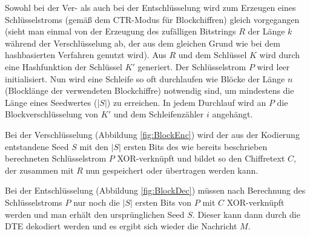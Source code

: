 Sowohl bei der Ver- als auch bei der Entschlüsselung wird zum Erzeugen eines Schlüsselstroms (gemäß dem CTR-Modus für Blockchiffren) gleich vorgegangen (sieht man einmal von der Erzeugung des zufälligen Bitstrings \(R\) der Länge \(k\) während der Verschlüsselung ab, der aus dem gleichen Grund wie bei dem hashbasierten Verfahren genutzt wird). Aus \(R\) und dem Schlüssel \(K\) wird durch eine Hashfunktion der Schlüssel \(K'\) generiert. Der Schlüsselstrom \(P\) wird leer initialisiert. Nun wird eine Schleife so oft durchlaufen wie Blöcke der Länge \(n\) (Blocklänge der verwendeten Blockchiffre) notwendig sind, um mindestens die Länge eines Seedwertes (\(|S|\)) zu erreichen. In jedem Durchlauf wird an \(P\) die Blockverschlüsselung von \(K'\) und dem Schleifenzähler \(i\) angehängt.

Bei der Verschlüsselung (Abbildung \ref{fig:BlockEnc}) wird der aus der Kodierung entstandene Seed \(S\) mit den \(|S|\) ersten Bits des wie bereits beschrieben berechneten Schlüsselstrom \(P\) XOR-verknüpft und bildet so den Chiffretext \(C\), der zusammen mit \(R\) nun gespeichert oder übertragen werden kann.

Bei der Entschlüsselung (Abbildung \ref{fig:BlockDec}) müssen nach Berechnung des Schlüsselstroms \(P\) nur noch die \(|S|\) ersten Bits von \(P\) mit \(C\) XOR-verknüpft werden und man erhält den ursprünglichen Seed \(S\). Dieser kann dann durch die DTE  dekodiert werden und es ergibt sich wieder die Nachricht \(M\).

\newpage